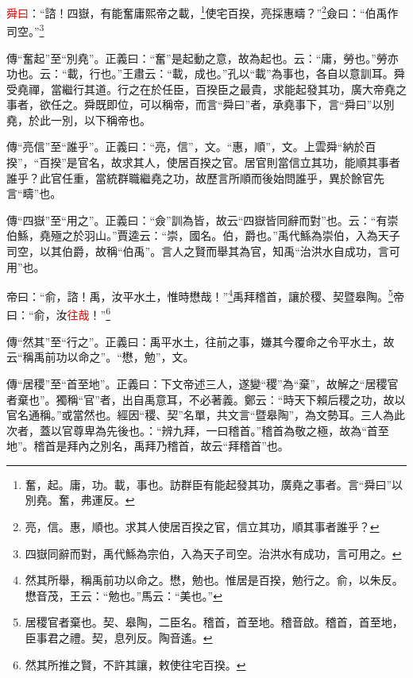 \textcolor{red}{舜曰}：“諮！四嶽，有能奮庸熙帝之載，\footnote{奮，起。庸，功。載，事也。訪群臣有能起發其功，廣堯之事者。言“舜曰”以別堯。奮，弗運反。}使宅百揆，亮採惠疇？”\footnote{亮，信。惠，順也。求其人使居百揆之官，信立其功，順其事者誰乎？}僉曰：“伯禹作司空。”\footnote{四嶽同辭而對，禹代鯀為宗伯，入為天子司空。治洪水有成功，言可用之。}

{\noindent\zhuan{}\fzbyks 傳“奮起”至“別堯”。正義曰：“奮”是起動之意，故為起也。云：“庸，勞也。”勞亦功也。云：“載，行也。”王肅云：“載，成也。”孔以“載”為事也，各自以意訓耳。舜受堯禪，當繼行其道。行之在於任臣，百揆臣之最貴，求能起發其功，廣大帝堯之事者，欲任之。舜既即位，可以稱帝，而言“舜曰”者，承堯事下，言“舜曰”以別堯，於此一別，以下稱帝也。 \par}

{\noindent\zhuan{}\fzbyks 傳“亮信”至“誰乎”。正義曰：“亮，信”，文。“惠，順”，文。上雲舜“納於百揆”，“百揆”是官名，故求其人，使居百揆之官。居官則當信立其功，能順其事者誰乎？此官任重，當統群職繼堯之功，故歷言所順而後始問誰乎，異於餘官先言“疇”也。 \par}

{\noindent\zhuan{}\fzbyks 傳“四嶽”至“用之”。正義曰：“僉”訓為皆，故云“四嶽皆同辭而對”也。云：“有崇伯鯀，堯殛之於羽山。”賈逵云：“崇，國名。伯，爵也。”禹代鯀為崇伯，入為天子司空，以其伯爵，故稱“伯禹”。言人之賢而舉其為官，知禹“治洪水自成功，言可用”也。 \par}

帝曰：“俞，諮！禹，汝平水土，惟時懋哉！”\footnote{然其所舉，稱禹前功以命之。懋，勉也。惟居是百揆，勉行之。俞，以朱反。懋音茂，王云：“勉也。”馬云：“美也。”}禹拜稽首，讓於稷、契暨皋陶。\footnote{居稷官者棄也。契、皋陶，二臣名。稽首，首至地。稽音啟。稽首，首至地，臣事君之禮。契，息列反。陶音遙。}帝曰：“俞，汝\textcolor{red}{往哉}！”\footnote{然其所推之賢，不許其讓，敕使往宅百揆。}

{\noindent\zhuan{}\fzbyks 傳“然其”至“行之”。正義曰：禹平水土，往前之事，嫌其今覆命之令平水土，故云“稱禹前功以命之”。“懋，勉”，文。 \par}

{\noindent\zhuan{}\fzbyks 傳“居稷”至“首至地”。正義曰：下文帝述三人，遂變“稷”為“棄”，故解之“居稷官者棄也”。獨稱“官”者，出自禹意耳，不必著義。鄭云：“時天下賴后稷之功，故以官名通稱。”或當然也。經因“稷、契”名單，共文言“暨皋陶”，為文勢耳。三人為此次者，蓋以官尊卑為先後也。：“辨九拜，一曰稽首。”稽首為敬之極，故為“首至地”。稽首是拜內之別名，禹拜乃稽首，故云“拜稽首”也。 \par}

